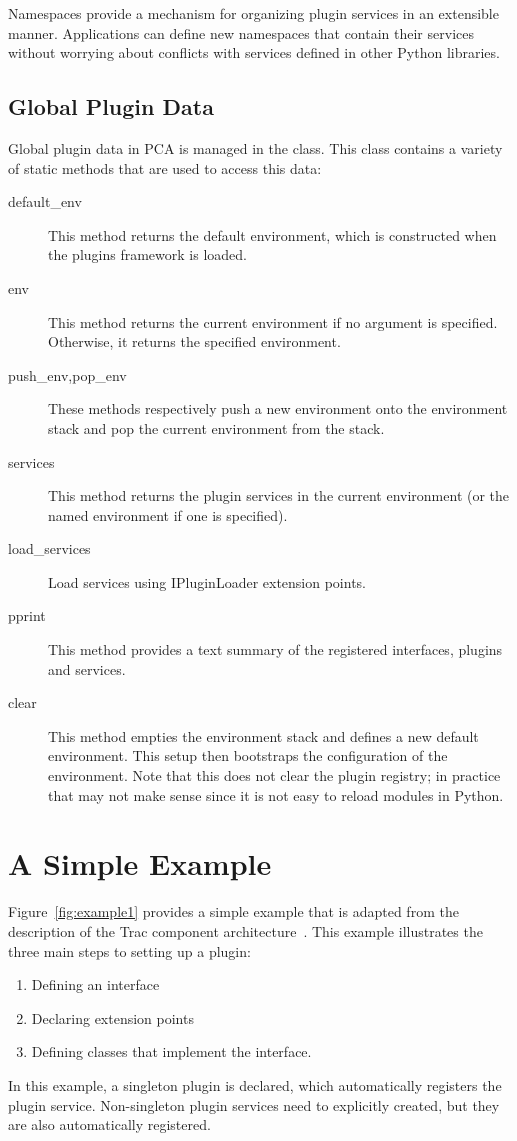 Namespaces provide a mechanism for organizing plugin services in an
extensible manner. Applications can define new namespaces that contain
their services without worrying about conflicts with services defined
in other Python libraries.

\subsection{Global Plugin Data}

Global plugin data in PCA is managed in the  class. This
class contains a variety of static methods that are used to access
this data:
\begin{description}
\item[default\_env] This method returns the default environment, which is constructed when the plugins framework is loaded. 
\item[env] This method returns the current environment if no argument is specified. Otherwise, it returns the specified environment. 
\item[push\_env,pop\_env] These methods respectively push a new environment onto the environment stack and pop the current environment from the stack. 
\item[services] This method returns the plugin services in the current environment (or the named environment if one is specified). 
\item[load\_services] Load services using IPluginLoader extension points. 
\item[pprint] This method provides a text summary of the registered interfaces, plugins and services. 
\item[clear] This method empties the environment stack and defines a new default environment. This setup then bootstraps the configuration of the  environment. Note that this does not clear the plugin registry; in practice that may not make sense since it is not easy to reload modules in Python. 
\end{description}


\section{A Simple Example}

Figure~\ref{fig:example1} provides a simple example that is adapted from the description of the Trac component architecture~\cite{TCA}. This example illustrates the three main steps to setting up a plugin:
\begin{enumerate}
\item Defining an interface
\item Declaring extension points
\item Defining classes that implement the interface. 
\end{enumerate}
In this example, a singleton plugin is declared, which automatically registers the plugin service. Non-singleton plugin services need to explicitly created, but they are also automatically registered.

